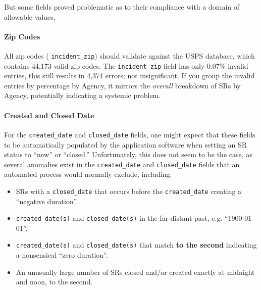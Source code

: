 \documentclass[linenumber]{jdsart}
\begin{document}
But some fields proved problematic as to their 
compliance with a domain of allowable values. 


\paragraph{Zip Codes}
\label{sec:zipcodesissues}
All zip codes ( \texttt{incident\_zip}) 
should validate against the USPS database, which contains 
44,173 valid zip codes. The \texttt{incident\_zip} field has 
only 0.07\% invalid entries, this still results in 4,374 errors; 
not insignificant. If you group the invalid entries by 
percentage by Agency, it mirrors the \textit{overall} 
breakdown of SRs by Agency, potentially 
indicating a systemic problem.


\paragraph{Created and Closed Date}
\label{sec:negativeduration}
For the \texttt{created\_date} and \texttt{closed\_date} fields, one 
might expect that these fields to be automatically populated by the  
application software when setting an SR status to ``new'' or ``closed.'' 
Unfortunately, this does not seem to be the case, as several anomalies 
exist in the \texttt{created\_date} and \texttt{closed\_date} fields that
an automated process would normally exclude, including:

\begin{itemize}
    \item SRs with a \texttt{closed\_date} that occurs before the 
    \texttt{created\_date} creating a ``negative duration''.
    \item \texttt{created\_date(s)} and \texttt{closed\_date(s)} in 
    the far distant past, e.g. ``1900-01-01''.
    \item \texttt{created\_date(s)} and \texttt{closed\_date(s)} that 
    match \textbf{to the second} indicating a nonsensical ``zero duration''.
    \item An unusually large number of SRs closed and/or created exactly at midnight 
    and noon, to the second.
\end{itemize}
\end{document}
